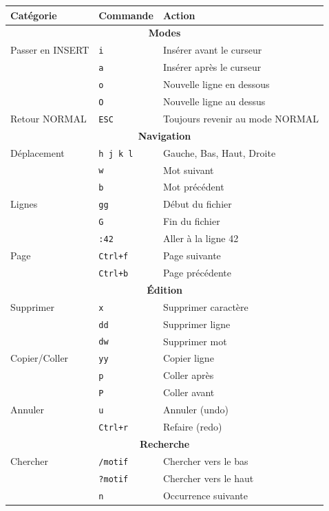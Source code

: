 \documentclass[10pt,a4paper]{article}
\begin{document}
\begin{center}
\begin{tabular}{|l|l|p{6cm}|}
\hline
\textbf{Catégorie} & \textbf{Commande} & \textbf{Action} \\
\hline
\hline
\multicolumn{3}{|c|}{\textbf{Modes}} \\
\hline
Passer en INSERT & \texttt{i} & Insérer avant le curseur \\
& \texttt{a} & Insérer après le curseur \\
& \texttt{o} & Nouvelle ligne en dessous \\
& \texttt{O} & Nouvelle ligne au dessus \\
Retour NORMAL & \texttt{ESC} & Toujours revenir au mode NORMAL \\
\hline
\hline
\multicolumn{3}{|c|}{\textbf{Navigation}} \\
\hline
Déplacement & \texttt{h j k l} & Gauche, Bas, Haut, Droite \\
& \texttt{w} & Mot suivant \\
& \texttt{b} & Mot précédent \\
Lignes & \texttt{gg} & Début du fichier \\
& \texttt{G} & Fin du fichier \\
& \texttt{:42} & Aller à la ligne 42 \\
Page & \texttt{Ctrl+f} & Page suivante \\
& \texttt{Ctrl+b} & Page précédente \\
\hline
\hline
\multicolumn{3}{|c|}{\textbf{Édition}} \\
\hline
Supprimer & \texttt{x} & Supprimer caractère \\
& \texttt{dd} & Supprimer ligne \\
& \texttt{dw} & Supprimer mot \\
Copier/Coller & \texttt{yy} & Copier ligne \\
& \texttt{p} & Coller après \\
& \texttt{P} & Coller avant \\
Annuler & \texttt{u} & Annuler (undo) \\
& \texttt{Ctrl+r} & Refaire (redo) \\
\hline
\hline
\multicolumn{3}{|c|}{\textbf{Recherche}} \\
\hline
Chercher & \texttt{/motif} & Chercher vers le bas \\
& \texttt{?motif} & Chercher vers le haut \\
& \texttt{n} & Occurrence suivante \\

\end{tabular}
\end{center}
\end{document}
